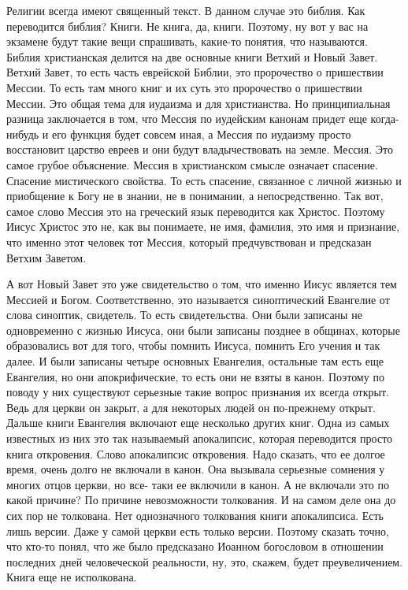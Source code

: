 Религии всегда имеют священный текст. В данном случае это библия. Как переводится
библия? Книги. Не книга, да, книги. Поэтому, ну вот у вас на экзамене будут
такие вещи спрашивать, какие-то понятия, что называются. Библия христианская
делится на две основные книги Ветхий и Новый Завет. Ветхий Завет, то есть часть
еврейской Библии, это пророчество о пришествии Мессии. То есть там много книг и
их суть это пророчество о пришествии Мессии. Это общая тема для иудаизма и для
христианства. Но принципиальная разница заключается в том, что Мессия по
иудейским канонам придет еще когда-нибудь и его функция будет совсем иная, а
Мессия по иудаизму просто восстановит царство евреев и они будут владычествовать
на земле. Мессия. Это самое грубое объяснение. Мессия в христианском смысле
означает спасение. Спасение мистического свойства. То есть спасение, связанное с
личной жизнью и приобщение к Богу не в знании, не в понимании, а
непосредственно. Так вот, самое слово Мессия это на греческий язык переводится
как Христос. Поэтому Иисус Христос это не, как вы понимаете, не имя, фамилия,
это имя и признание, что именно этот человек тот Мессия, который предчувствован
и предсказан Ветхим Заветом. 

А вот Новый Завет это уже свидетельство о том, что
именно Иисус является тем Мессией и Богом. Соответственно, это называется
синоптический Евангелие от слова синоптик, свидетель. То есть свидетельства. Они
были записаны не одновременно с жизнью Иисуса, они были записаны позднее в
общинах, которые образовались вот для того, чтобы помнить Иисуса, помнить Его
учения и так далее. И были записаны четыре основных Евангелия, остальные там
есть еще Евангелия, но они апокрифические, то есть они не взяты в канон. Поэтому
по поводу у них существуют серьезные такие вопрос признания их всегда открыт.
Ведь для церкви он закрыт, а для некоторых людей он по-прежнему открыт. Дальше
книги Евангелия включают еще несколько других книг. Одна из самых известных из
них это так называемый апокалипсис, которая переводится просто книга откровения.
Слово апокалипсис откровения. Надо сказать, что ее долгое время, очень долго не
включали в канон. Она вызывала серьезные сомнения у многих отцов церкви, но все-
таки ее включили в канон. А не включали это по какой причине? По причине
невозможности толкования. И на самом деле она до сих пор не толкована. Нет
однозначного толкования книги апокалипсиса. Есть лишь версии. Даже у самой
церкви есть только версии. Поэтому сказать точно, что кто-то понял, что же было
предсказано Иоанном богословом в отношении последних дней человеческой
реальности, ну, это, скажем, будет преувеличением. Книга еще не исполкована.

